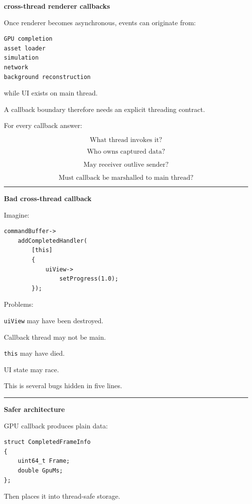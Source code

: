 \textbf{cross-thread renderer callbacks}

Once renderer becomes asynchronous, events can originate from:

\begin{verbatim}
GPU completion
asset loader
simulation
network
background reconstruction
\end{verbatim}

while UI exists on main thread.

A callback boundary therefore needs an explicit threading contract.

For every callback answer:

\[
\boxed{
\text{What thread invokes it?}
}
\]

\[
\boxed{
\text{Who owns captured data?}
}
\]

\[
\boxed{
\text{May receiver outlive sender?}
}
\]

\[
\boxed{
\text{Must callback be marshalled to main thread?}
}
\]

\begin{center}\rule{0.5\linewidth}{0.5pt}\end{center}

\textbf{Bad cross-thread callback}

Imagine:

\begin{verbatim}
commandBuffer->
    addCompletedHandler(
        [this]
        {
            uiView->
                setProgress(1.0);
        });
\end{verbatim}

Problems:

\texttt{uiView} may have been destroyed.

Callback thread may not be main.

\texttt{this} may have died.

UI state may race.

This is several bugs hidden in five lines.

\begin{center}\rule{0.5\linewidth}{0.5pt}\end{center}

\textbf{Safer architecture}

GPU callback produces plain data:

\begin{verbatim}
struct CompletedFrameInfo
{
    uint64_t Frame;
    double GpuMs;
};
\end{verbatim}

Then places it into thread-safe storage.


